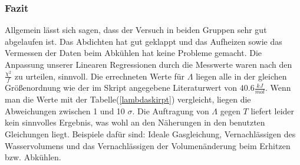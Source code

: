 \documentclass[12pt,a4paper]{article}
\begin{document}
\subsubsection{Fazit}
Allgemein lässt sich sagen, dass der Versuch in beiden Gruppen sehr gut abgelaufen ist. Das Abdichten hat gut geklappt und das Aufheizen sowie das Vermessen der Daten beim Abkühlen hat keine Probleme gemacht.
Die Anpassung unserer Linearen Regressionen durch die Messwerte waren nach den $\frac{\chi^2}{f}$ zu urteilen, sinnvoll.
Die errechneten Werte für $\Lambda$ liegen alle in der gleichen Größenordnung wie der im Skript angegebene Literaturwert von $40.6 \frac{kJ}{mol}$.
Wenn man die Werte mit der Tabelle(\ref{lambdaskirpt}) vergleicht, liegen die Abweichungen zwischen 1 und 10 $\sigma$. 
Die Auftragung von $\Lambda$ gegen $T$ liefert leider kein sinnvolles Ergebnis, was wohl an den Näherungen in den benutzten Gleichungen liegt.
Beispiele dafür sind: Ideale Gasgleichung, Vernachlässigen des Wasservolumens und das Vernachlässigen der Volumenänderung beim Erhitzen bzw. Abkühlen.
\end{document}
